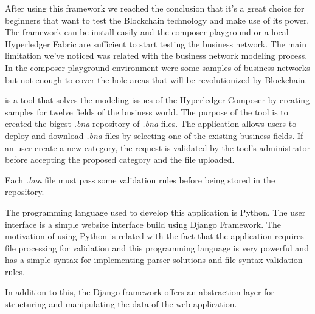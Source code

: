 After using this framework we reached the conclusion that it's a great choice for beginners that want to test the Blockchain technology and make use of its power.
The framework can be install easily and the composer playground or a local Hyperledger Fabric are sufficient to start testing the business network.
The main limitation we've noticed was related with the business network modeling process.
In the composer playground environment were some samples of business networks but not enough to cover the hole areas that will be revolutionized by Blockchain.

\textbf{\project} is a tool that solves the modeling issues of the Hyperledger Composer by creating samples for twelve fields of the business world.
The purpose of the tool is to created the bigest \emph{.bna} repository of \emph{.bna} files. The application allows users to deploy and download \emph{.bna} files by selecting one of the existing business fields.
If an user create a new category, the request is validated by the tool's administrator before accepting the proposed category and the file uploaded.

Each \emph{.bna} file must pass some validation rules before being stored in the repository.

The programming language used to develop this application is Python. The user interface is a simple website interface build using Django Framework. 
The motivation of using Python is related with the fact that the application requires file processing for validation and this programming language is very powerful and has a simple syntax for implementing parser solutions and file syntax validation rules.

In addition to this, the Django framework offers an abstraction layer for structuring and manipulating the data of the web application.

 
